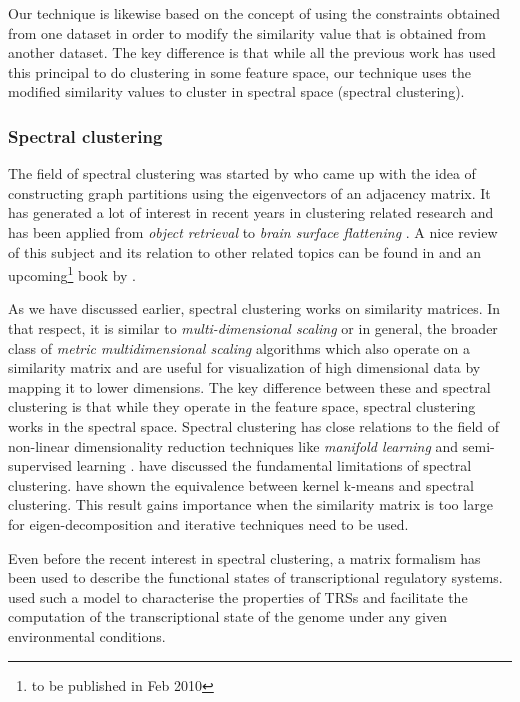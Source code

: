 Our technique is likewise based on the concept of using the constraints obtained from one dataset in order to modify the similarity value that is obtained from another dataset. The key difference is that while all the previous work has used this principal to do clustering in some feature space, our technique uses the modified similarity values to cluster in spectral space (spectral clustering). 

\subsubsection{Spectral clustering}
The field of spectral clustering was started by \citet{donath1973lower} who came up with the idea of constructing graph partitions using the eigenvectors of an adjacency matrix. It has generated a lot of interest in recent years \citep{shi00normalized,ng2001onspectral} in clustering related research and has been applied from \textit{object retrieval} \citep{jain06spectral} to \textit{brain surface flattening} \citep{angenent99laplace}. A nice review of this subject and its relation to other related topics can be found in \citet{luxberg2006tutorial_spectral} and an upcoming\footnote{to be published in Feb 2010} book by \citet{ding2008spectral}.

As we have discussed earlier, spectral clustering works on similarity matrices. In that respect, it is similar to \textit{multi-dimensional scaling} or in general, the broader class of \textit{metric multidimensional scaling} \citep{deleeuw2005mds} algorithms which also operate on a similarity matrix and are useful for visualization of high dimensional data by mapping it to lower dimensions. The key difference between these and spectral clustering is that while they operate in the feature space, spectral clustering works in the spectral space. Spectral clustering has close relations to the field of non-linear dimensionality reduction techniques like \textit{manifold learning} \citep{saul2006smd, haifang2006manifold} and semi-supervised learning \citep{grira2005unsupsurvey}. \citet{nadler06fundamental} have discussed the fundamental limitations of spectral clustering. \citet{dhillon05unified} have shown the equivalence between kernel k-means \citep{johnshaw2004kernelmethods} and spectral clustering. This result gains importance when the similarity matrix is too large for eigen-decomposition and iterative techniques need to be used. 

Even before the recent interest in spectral clustering, a matrix formalism has been used to describe the functional states of transcriptional regulatory systems. \citet{gianchandani2006matrix} used such a model to characterise the properties of \acp{TRS} and facilitate the computation of the transcriptional state of the genome under any given environmental conditions. 

